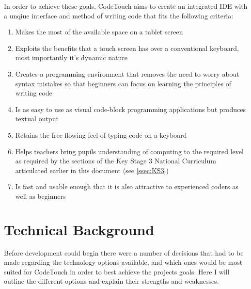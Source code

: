\documentclass[ %
                    author={Jonathan Rankin},
                supervisor={Dr. David May, Dr. Ian Holyer},
                    degree={MEng},
                     title={CodeTouch},
                  subtitle={A Revolutionary Way To Program Real Code On Touch Screen Devices},
                      type={enterprise},
                      year={2015 } ]{dissertation}
\begin{document}
In order to achieve these goals, CodeTouch aims to create an integrated IDE with a unqiue interface and method of writing code that fits the following criteria:



\begin{enumerate}
\item Makes the most of the available space on a tablet screen
\item Exploits the benefits that a touch screen has over a conventional keyboard, most importantly it's dynamic nature 
\item Creates a programming environment that removes the need to worry about syntax mistakes so that beginners can focus on learning the principles of writing code
\item Is as easy to use as visual code-block programming applications but produces textual output
\item Retains the free flowing feel of typing code on a keyboard
\item Helps teachers bring pupils understanding of computing to the required level as required by the sections of the Key Stage 3 National Curriculum articulated earlier in this document (see \ref{ssec:KS3})
\item Is fast and usable enough that it is also attractive to experienced coders as well as beginners 
\end{enumerate}





\chapter{Technical Background}
\label{chap:technical}


Before development could begin there were a number of decisions that had to be made regarding the technology options available, and which ones would be most suited for CodeTouch in order to best achieve the projects goals. Here I will outline the different options and explain their strengths and weaknesses. 
\end{document}
